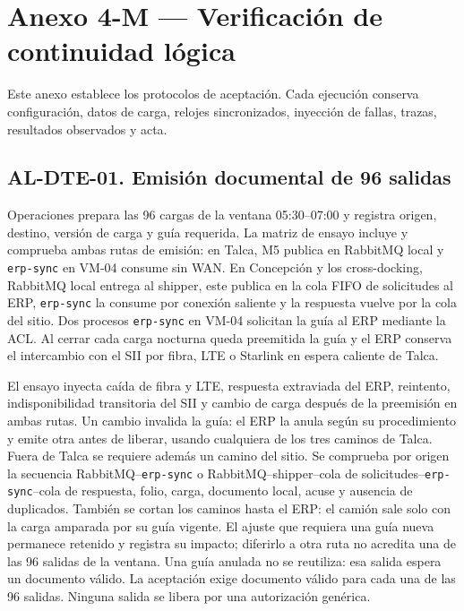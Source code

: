 \section*{Anexo 4-M — Verificación de continuidad lógica}
\label{anx:M}
Este anexo establece los protocolos de aceptación. Cada ejecución conserva configuración, datos de carga, relojes sincronizados, inyección de fallas, trazas, resultados observados y acta.

\subsection*{AL-DTE-01. Emisión documental de 96 salidas}
Operaciones prepara las 96 cargas de la ventana 05:30--07:00 y registra origen, destino, versión de carga y guía requerida. La matriz de ensayo incluye y comprueba ambas rutas de emisión: en Talca, M5 publica en RabbitMQ local y \texttt{erp-sync} en VM-04 consume sin WAN. En Concepción y los cross-docking, RabbitMQ local entrega al shipper, este publica en la cola FIFO de solicitudes al ERP, \texttt{erp-sync} la consume por conexión saliente y la respuesta vuelve por la cola del sitio. Dos procesos \texttt{erp-sync} en VM-04 solicitan la guía al ERP mediante la ACL. Al cerrar cada carga nocturna queda preemitida la guía y el ERP conserva el intercambio con el SII por fibra, LTE o Starlink en espera caliente de Talca.

El ensayo inyecta caída de fibra y LTE, respuesta extraviada del ERP, reintento, indisponibilidad transitoria del SII y cambio de carga después de la preemisión en ambas rutas. Un cambio invalida la guía: el ERP la anula según su procedimiento y emite otra antes de liberar, usando cualquiera de los tres caminos de Talca. Fuera de Talca se requiere además un camino del sitio. Se comprueba por origen la secuencia RabbitMQ--\texttt{erp-sync} o RabbitMQ--shipper--cola de solicitudes--\texttt{erp-sync}--cola de respuesta, folio, carga, documento local, acuse y ausencia de duplicados. También se cortan los caminos hasta el ERP: el camión sale solo con la carga amparada por su guía vigente. El ajuste que requiera una guía nueva permanece retenido y registra su impacto; diferirlo a otra ruta no acredita una de las 96 salidas de la ventana. Una guía anulada no se reutiliza: esa salida espera un documento válido. La aceptación exige documento válido para cada una de las 96 salidas. Ninguna salida se libera por una autorización genérica.


